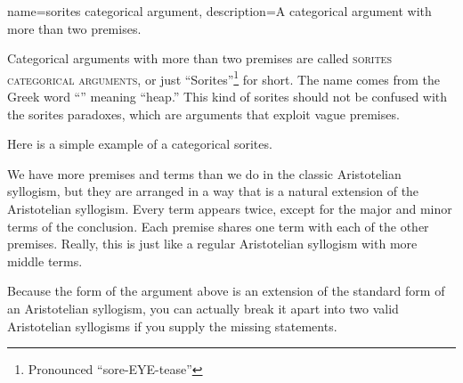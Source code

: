{
name=sorites categorical argument,
description={A categorical argument with more than two premises.}
}

Categorical arguments with more than two premises are called \textsc{\glspl{sorites categorical argument}}, \label{def:sorites_categorical_arguments} or just ``Sorites''\footnote{Pronounced ``sore-EYE-tease''} for short. The name comes from the Greek word ``\textSigma\textomikron\textrho\textomikron\textvarsigma'' meaning ``heap.'' This kind of sorites should not be confused with the sorites paradoxes, which are arguments that exploit vague premises.

Here is a simple example of a categorical sorites.

\begin{kormanize}
\end{kormanize}

We have more premises and terms than we do in the classic Aristotelian syllogism, but they are arranged in a way that is a natural extension of the Aristotelian syllogism. Every term appears twice, except for the major and minor terms of the conclusion. Each premise shares one term with each of the other premises. Really, this is just like a regular Aristotelian syllogism with more middle terms.

Because the form of the argument above is an extension of the standard form of an Aristotelian syllogism, you can actually break it apart into two valid Aristotelian syllogisms if you supply the missing statements.



